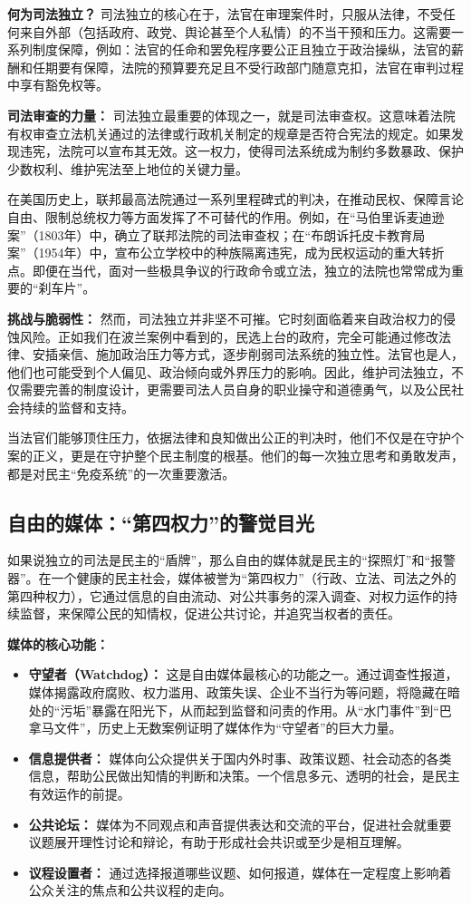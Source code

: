 \documentclass[UTF8, 10pt]{ctexbook}
\begin{document}
\textbf{何为司法独立？} 司法独立的核心在于，法官在审理案件时，只服从法律，不受任何来自外部（包括政府、政党、舆论甚至个人私情）的不当干预和压力。这需要一系列制度保障，例如：法官的任命和罢免程序要公正且独立于政治操纵，法官的薪酬和任期要有保障，法院的预算要充足且不受行政部门随意克扣，法官在审判过程中享有豁免权等。

\textbf{司法审查的力量：} 司法独立最重要的体现之一，就是司法审查权。这意味着法院有权审查立法机关通过的法律或行政机关制定的规章是否符合宪法的规定。如果发现违宪，法院可以宣布其无效。这一权力，使得司法系统成为制约多数暴政、保护少数权利、维护宪法至上地位的关键力量。

在美国历史上，联邦最高法院通过一系列里程碑式的判决，在推动民权、保障言论自由、限制总统权力等方面发挥了不可替代的作用。例如，在“马伯里诉麦迪逊案”（1803年）中，确立了联邦法院的司法审查权；在“布朗诉托皮卡教育局案”（1954年）中，宣布公立学校中的种族隔离违宪，成为民权运动的重大转折点。即便在当代，面对一些极具争议的行政命令或立法，独立的法院也常常成为重要的“刹车片”。

\textbf{挑战与脆弱性：} 然而，司法独立并非坚不可摧。它时刻面临着来自政治权力的侵蚀风险。正如我们在波兰案例中看到的，民选上台的政府，完全可能通过修改法律、安插亲信、施加政治压力等方式，逐步削弱司法系统的独立性。法官也是人，他们也可能受到个人偏见、政治倾向或外界压力的影响。因此，维护司法独立，不仅需要完善的制度设计，更需要司法人员自身的职业操守和道德勇气，以及公民社会持续的监督和支持。

当法官们能够顶住压力，依据法律和良知做出公正的判决时，他们不仅是在守护个案的正义，更是在守护整个民主制度的根基。他们的每一次独立思考和勇敢发声，都是对民主“免疫系统”的一次重要激活。

\subsection{自由的媒体：“第四权力”的警觉目光}
如果说独立的司法是民主的“盾牌”，那么自由的媒体就是民主的“探照灯”和“报警器”。在一个健康的民主社会，媒体被誉为“第四权力”（行政、立法、司法之外的第四种权力），它通过信息的自由流动、对公共事务的深入调查、对权力运作的持续监督，来保障公民的知情权，促进公共讨论，并追究当权者的责任。

\textbf{媒体的核心功能：}
\begin{itemize}
    \item \textbf{守望者（Watchdog）：} 这是自由媒体最核心的功能之一。通过调查性报道，媒体揭露政府腐败、权力滥用、政策失误、企业不当行为等问题，将隐藏在暗处的“污垢”暴露在阳光下，从而起到监督和问责的作用。从“水门事件”到“巴拿马文件”，历史上无数案例证明了媒体作为“守望者”的巨大力量。
    \item \textbf{信息提供者：} 媒体向公众提供关于国内外时事、政策议题、社会动态的各类信息，帮助公民做出知情的判断和决策。一个信息多元、透明的社会，是民主有效运作的前提。
    \item \textbf{公共论坛：} 媒体为不同观点和声音提供表达和交流的平台，促进社会就重要议题展开理性讨论和辩论，有助于形成社会共识或至少是相互理解。
    \item \textbf{议程设置者：} 通过选择报道哪些议题、如何报道，媒体在一定程度上影响着公众关注的焦点和公共议程的走向。
\end{itemize}
\end{document}
